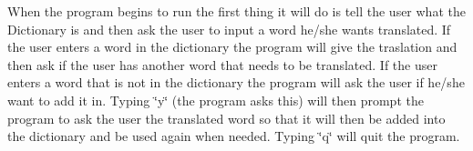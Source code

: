 When the program begins to run the first thing it will do is tell the user what the Dictionary is and then ask the user to input a word he/she wants translated. If the user enters a word in the dictionary the program will give the traslation and then ask if the user has another word that needs to be translated. If the user enters a word that is not in the dictionary the program will ask the user if he/she want to add it in. Typing \char`\"{}y\char`\"{} (the program asks this) will then prompt the program to ask the user the translated word so that it will then be added into the dictionary and be used again when needed. Typing \char`\"{}q\char`\"{} will quit the program. 